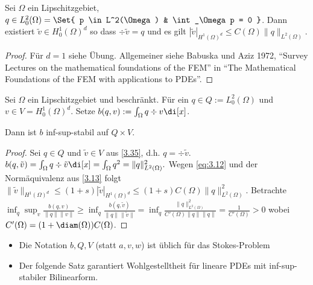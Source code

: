 \begin{st} \label{3.35}
	Sei $\Omega$ ein Lipschitzgebiet, $q \in L_0^2(\Omega) = \Set{ p \in L^2(\Omega) & \int_\Omega p = 0 }$.
	Dann existiert $\tilde v \in H_0^1(\Omega)^d$ so dass $\div \tilde v = q$ und es gilt
	\begin{math}[numbered] \label{eq:3.12}
		|\tilde v|_{H^1(\Omega)^d}
		\le C(\Omega) \|q\|_{L^2(\Omega)}.
	\end{math}
	\begin{proof}
		Für $d = 1$ siehe Übung.
		Allgemeiner siehe Babuska und Aziz 1972, “Survey Lectures on the mathematical foundations of the FEM” in “The Mathematical Foundations of the FEM with applications to PDEs”.
	\end{proof}
\end{st}

\begin{kor} \label{3.36}
	Sei $\Omega$ ein Lipschitzgebiet und beschränkt.
	Für ein $q \in Q := L_0^2(\Omega)$ und $v \in V = H_0^1(\Omega)^d$.
	Setze $b(q,v) := \int_\Omega q \div v \di[x]$.

	Dann ist $b$ inf-sup-stabil auf $Q \times V$.
	\begin{proof}
		Sei $q \in Q$ und $\tilde v \in V$ aus \ref{3.35}, d.h. $q = \div \tilde v$.
		\begin{math}
			b(q,\tilde v)
			= \int_\Omega q \div \tilde v \di[x]
			= \int_\Omega q^2
			= \|q\|^2_{L^2(\Omega)}.
		\end{math}
		Wegen \eqref{eq:3.12} und der Normäquivalenz aus \ref{3.13} folgt
		\begin{math}
			\|\tilde v\|_{H^1(\Omega)^d}
			\le (1+s) |\tilde v|_{H^1(\Omega)^d}
			\le (1+s) C(\Omega) \|q\|_{L^2(\Omega)}^2.
		\end{math}
		Betrachte
		\begin{math}
			\inf_{q} \sup_{v} \frac{b(q,v)}{\|q\|\|v\|}
			\ge \inf_{q} \frac{b(q,\tilde v)}{\|q\|\|\tilde v\|}
			= \inf_{q} \frac{\|q\|_{L^2(\Omega)}^2}{C'(\Omega) \|q\|\|q\|}
			= \frac{1}{C'(\Omega)}
			> 0
		\end{math}
		wobei $C'(\Omega) = (1 + \diam(\Omega)) C(\Omega)$.
	\end{proof}
\end{kor}

\begin{note}
	\begin{itemize}
		\item
			Die Notation $b, Q, V$ (statt $a, v, w$) ist üblich für das Stokes-Problem
		\item
			Der folgende Satz garantiert Wohlgestelltheit für lineare PDEs mit inf-sup-stabiler Bilinearform.
	\end{itemize}
\end{note}

